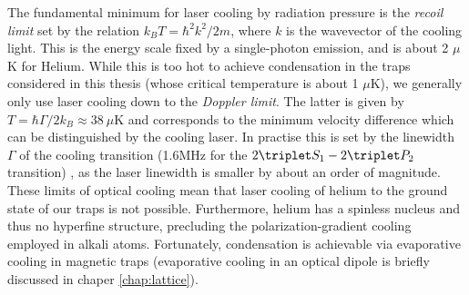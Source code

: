 
	The fundamental minimum for laser cooling by radiation pressure is the \emph{recoil limit} set by the relation $k_B T = \hbar^2k^2/2m$, where $k$ is the wavevector of the cooling light.
	This is the energy scale fixed by a single-photon emission, and is about 2 $\mu$K for Helium.
	While this is too hot to achieve condensation in the traps considered in this thesis (whose critical temperature is about 1 $\mu$K), we generally only use laser cooling down to the \emph{Doppler limit}.
	The latter is given by $T = \hbar\Gamma/2 k_B\approx 38~\mu$K and corresponds to the minimum velocity difference which can be distinguished by the cooling laser.
	In practise this is set by the linewidth $\Gamma$ of the cooling transition (1.6MHz for the $2\triplet S_1 - 2\triplet P_2$ transition) , as the laser linewidth is smaller by about an order of magnitude\cite{Shin16}.
	These limits of optical cooling mean that laser cooling of helium to the ground state of our traps is not possible.
	Furthermore, helium has a spinless nucleus and thus no hyperfine structure, precluding the polarization-gradient cooling employed in alkali atoms.
	Fortunately, condensation is achievable via evaporative cooling in magnetic traps (evaporative cooling in an optical dipole is briefly discussed in chaper \ref{chap:lattice}).
	
